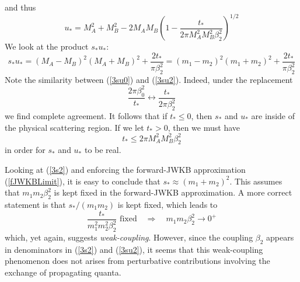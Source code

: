 and thus
\begin{equation}
	u_{*} = M_{A}^{2} + M_{B}^{2} - 2 M_{A} M_{B} \left( 1 - \frac{t_{*}}{2\pi M_{A}^{2} M_{B}^{2} \beta_{2}^{2}} \right)^{1/2} \label{3u2}
\end{equation}
We look at the product $s_{*} u_{*}$:
\begin{equation}
	s_{*} u_{*} = (M_{A} - M_{B})^{2}(M_{A} + M_{B})^{2} + \frac{2 t_{*}}{\pi \beta_{2}^{2}}
	= (m_{1} - m_{2})^{2}(m_{1} + m_{2})^{2} + \frac{2 t_{*}}{\pi \beta_{2}^{2}} \label{3su2}
\end{equation}
Note the similarity between (\ref{3su0}) and (\ref{3su2}). Indeed, under the replacement
\begin{equation}
	\frac{2\pi \beta_{0}^{2}}{t_{*}} \longleftrightarrow \frac{t_{*}}{2\pi \beta_{2}^{2}}
\end{equation}
we find complete agreement. It follows that if $t_{*} \leq 0$, then $s_{*}$ and $u_{*}$ are inside of the physical scattering region. If we let $t_{*} > 0$, then we must have
\begin{equation}
	t_{*} \leq 2 \pi M_{A}^{2} M_{B}^{2} \beta_{2}^{2}
\end{equation}
in order for $s_{*}$ and $u_{*}$ to be real.

Looking at (\ref{3s2}) and enforcing the forward-JWKB approximation (\ref{fJWKBLimit}), it is easy to conclude that $s_{*} \approx (m_{1} + m_{2})^{2}$. This assumes that $m_{1} m_{2} \beta_{2}^{2}$ is kept fixed in the forward-JWKB approximation. A more correct statement is that $s_{*} / (m_{1} m_{2})$ is kept fixed, which leads to
\begin{equation}
	\frac{t_{*}}{m_{1}^{2} m_{2}^{2} \beta_{2}^{2}} \text{ fixed} \quad \Longrightarrow \quad m_{1} m_{2} \beta_{2}^{2} \rightarrow 0^{+}
\end{equation}
which, yet again, suggests \textit{weak-coupling}. However, since the coupling $\beta_{2}$ appears in denominators in (\ref{3s2}) and (\ref{3su2}), it seems that this weak-coupling phenomenon does not arises from perturbative contributions involving the exchange of propagating quanta.